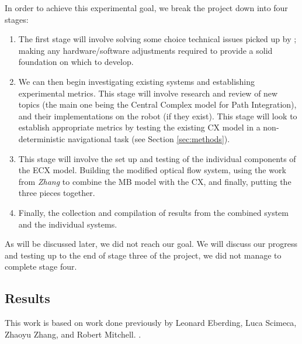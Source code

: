 \documentclass[a4paper,11pt,twoside,openright]{article}
\begin{document}
In order to achieve this experimental goal, we break the project down
into four stages:

\begin{enumerate}
\item{The first stage will involve solving some choice technical issues
  picked up by \cite{Mitchell2018}; making any hardware/software adjustments
  required to provide a solid foundation on which to develop.}

\item{We can then begin investigating existing systems and establishing
  experimental metrics. This stage will involve research and review of new topics
  (the main one being the Central Complex model for Path Integration), and their
implementations on the robot (if they exist). This stage will look to establish
appropriate metrics by testing the existing CX model in a non-deterministic
navigational task (see Section \ref{sec:methods}).}

\item{This stage will involve the set up and testing of the individual components
  of the ECX model. Building the modified optical flow system, using the work
  from \textit{Zhang} to combine the MB model with the CX, and finally, putting
  the three pieces together.}

\item{Finally, the collection and compilation of results from the combined system
and the individual systems.}
\end{enumerate}

As will be discussed later, we did not reach our goal. We will discuss
our progress and testing up to the end of stage three of the project, we did not
manage to complete stage four.

\subsection { Results }
This work is based on work done previously by Leonard Eberding, Luca Scimeca,
Zhaoyu Zhang, and Robert Mitchell.
\cite{Eberding2016, Scimeca2017, Zhang2017, Mitchell2018}.
\newline
\end{document}

